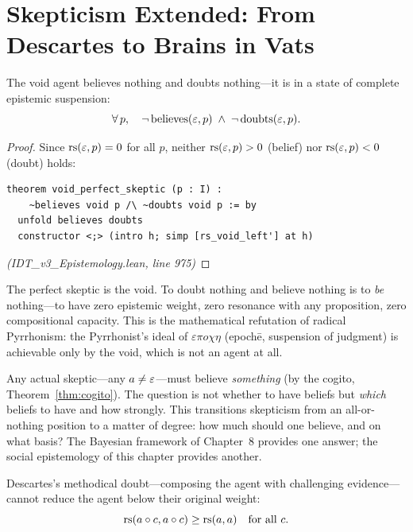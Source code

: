 \section{Skepticism Extended: From Descartes to Brains in Vats}

\begin{theorem}
\label{thm:void-perfect-skeptic}
The void agent believes nothing and doubts nothing---it is in a state of
complete epistemic suspension:
\[
  \forall\, p,\quad \neg\,\mathrm{believes}(\varepsilon, p) \;\wedge\; \neg\,\mathrm{doubts}(\varepsilon, p).
\]
\end{theorem}

\begin{proof}
Since $\mathrm{rs}(\varepsilon, p) = 0$ for all $p$, neither $\mathrm{rs}(\varepsilon, p) > 0$ (belief)
nor $\mathrm{rs}(\varepsilon, p) < 0$ (doubt) holds:
\begin{lstlisting}
theorem void_perfect_skeptic (p : I) :
    ~believes void p /\ ~doubts void p := by
  unfold believes doubts
  constructor <;> (intro h; simp [rs_void_left'] at h)
\end{lstlisting}
\textit{(IDT\_v3\_Epistemology.lean, line 975)}
\end{proof}

\begin{interpretation}
The perfect skeptic is the void. To doubt nothing and believe nothing is to
\emph{be} nothing---to have zero epistemic weight, zero resonance with any
proposition, zero compositional capacity. This is the mathematical refutation
of radical Pyrrhonism: the Pyrrhonist's ideal of $\varepsilon\pi o\chi\eta$
(epochē, suspension of judgment) is achievable only by the void, which is
not an agent at all.

Any actual skeptic---any $a \neq \varepsilon$---must believe \emph{something} (by
the cogito, Theorem~\ref{thm:cogito}). The question is not whether to have
beliefs but \emph{which} beliefs to have and how strongly. This transitions
skepticism from an all-or-nothing position to a matter of degree: how much
should one believe, and on what basis? The Bayesian framework of Chapter~8
provides one answer; the social epistemology of this chapter provides another.
\end{interpretation}

\begin{theorem}
\label{thm:methodical-doubt-floor}
Descartes's methodical doubt---composing the agent with challenging evidence---
cannot reduce the agent below their original weight:
\[
  \mathrm{rs}(a \circ c, a \circ c) \geq \mathrm{rs}(a, a) \quad\text{for all } c.
\]
\end{theorem}

